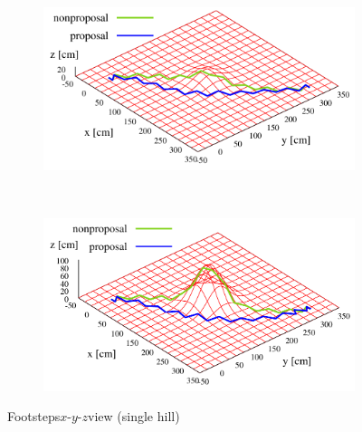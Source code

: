 \documentclass[autodetect-engine,dvipdfmx-if-dvi,ja=standard,a4j,jbase=11pt,magstyle=nomag*]{bxjsreport}
\begin{document}
\begin{figure}[pt]%
    \centering%
    \begin{subfigure}[c]{\linewidth}
        \centering%
        \includegraphics[width=\linewidth, clip]{./figure/sim_hrp2_hill_25_xyz.pdf}%
        \label{fig:sim_hrp2_hill_25_xyz}%
    \end{subfigure}\\ %
    \vfil%
    \begin{subfigure}[c]{\linewidth}
        \centering%
        \includegraphics[width=\linewidth, clip]{./figure/sim_hrp2_hill_100_xyz.pdf}%
        \label{fig:sim_hrp2_hill_100_xyz}%
    \end{subfigure}%
    \caption{Footsteps$x$-$y$-$z$view (single hill)}%
    \label{fig:sim_hrp2_hill}%
\end{figure}
\end{document}
